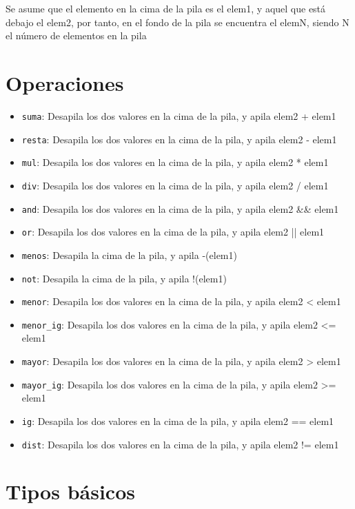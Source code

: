 Se asume que el elemento en la cima de la pila es el elem1, y aquel que está debajo el elem2, por tanto, en el fondo de la pila se encuentra el elemN, siendo N el número de elementos en la pila

\section{Operaciones}

\begin{itemize}
    \item \texttt{suma}: Desapila los dos valores en la cima de la pila, y apila elem2 + elem1
    \item \texttt{resta}: Desapila los dos valores en la cima de la pila, y apila elem2 - elem1
    \item \texttt{mul}: Desapila los dos valores en la cima de la pila, y apila elem2 * elem1
    \item \texttt{div}: Desapila los dos valores en la cima de la pila, y apila elem2 / elem1
    \item \texttt{and}: Desapila los dos valores en la cima de la pila, y apila elem2 \&\& elem1
    \item \texttt{or}: Desapila los dos valores en la cima de la pila, y apila elem2 || elem1
    \item \texttt{menos}: Desapila la cima de la pila, y apila -(elem1)
    \item \texttt{not}: Desapila la cima de la pila, y apila !(elem1)
    \item \texttt{menor}: Desapila los dos valores en la cima de la pila, y apila elem2 < \; elem1
    \item \texttt{menor\_ig}: Desapila los dos valores en la cima de la pila, y apila elem2 <= elem1
    \item \texttt{mayor}: Desapila los dos valores en la cima de la pila, y apila elem2 > \; elem1
    \item \texttt{mayor\_ig}: Desapila los dos valores en la cima de la pila, y apila elem2 >= elem1
    \item \texttt{ig}: Desapila los dos valores en la cima de la pila, y apila elem2 == elem1
    \item \texttt{dist}: Desapila los dos valores en la cima de la pila, y apila elem2 != elem1
\end{itemize}

\section{Tipos básicos}

